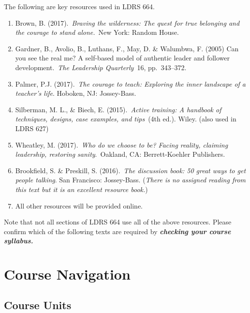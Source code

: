\documentclass[
]{book}
\begin{document}
The following are key resources used in LDRS 664.

\begin{enumerate}
\def\labelenumi{\arabic{enumi}.}
\item
  Brown, B. (2017).~\emph{Braving the wilderness: The quest for true belonging and the courage to stand alone.}~New York: Random House.
\item
  Gardner, B., Avolio, B., Luthans, F., May, D. \& Walumbwa, F. (2005) Can you see the real me? A self-based model of authentic leader and follower development.~\emph{The Leadership Quarterly}~16, pp.~343--372.
\item
  Palmer, P.J. (2017).~\emph{The courage to teach: Exploring the inner landscape of a teacher's life}. Hoboken, NJ: Jossey-Bass.
\item
  Silberman, M. L., \& Biech, E. (2015).~\emph{Active training: A handbook of techniques, designs, case examples, and tips}~(4th ed.). Wiley. (also used in LDRS 627)
\item
  Wheatley, M. (2017).~\emph{Who do we choose to be? Facing reality, claiming leadership, restoring sanity}.~Oakland, CA: Berrett-Koehler Publishers.
\item
  Brookfield, S. \& Preskill, S. (2016).~\emph{The discussion book: 50 great ways to get people talking}. San Francisco: Jossey-Bass. (\emph{There is no assigned reading from this text but it is an excellent resource book.})
\item
  All other resources will be provided online.
\end{enumerate}

\begin{caution}
Note that not all sections of LDRS 664 use all of the above resources.
Please confirm which of the following texts are required by
\textbf{\emph{checking your course syllabus.}}
\end{caution}

\hypertarget{course-navigation}{%
\section*{Course Navigation}\label{course-navigation}}

\hypertarget{course-units-1}{%
\subsection*{Course Units}\label{course-units-1}}
\end{document}
